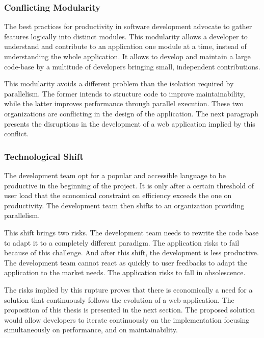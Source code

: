 \subsubsection{Conflicting Modularity}

The best practices for productivity in software development advocate to gather features logically into distinct modules.
This modularity allows a developer to understand and contribute to an application one module at a time, instead of understanding the whole application.
It allows to develop and maintain a large code-base by a multitude of developers bringing small, independent contributions.

This modularity avoids a different problem than the isolation required by parallelism.
The former intends to structure code to improve maintainability, while the latter improves performance through parallel execution.
These two organizations are conflicting in the design of the application.
The next paragraph presents the disruptions in the development of a web application implied by this conflict.

\subsubsection{Technological Shift}

The development team opt for a popular and accessible language to be productive in the beginning of the project. %
It is only after a certain threshold of user load that the economical constraint on efficiency exceeds the one on productivity.
The development team then shifts to an organization providing parallelism.

This shift brings two risks.
The development team needs to rewrite the code base to adapt it to a completely different paradigm.
The application risks to fail because of this challenge.
And after this shift, the development is less productive.
The development team cannot react as quickly to user feedbacks to adapt the application to the market needs.
The application risks to fall in obsolescence.

The risks implied by this rupture proves that there is economically a need for a solution that continuously follows the evolution of a web application.
The proposition of this thesis is presented in the next section.
The proposed solution would allow developers to iterate continuously on the implementation focusing simultaneously on performance, and on maintainability.

